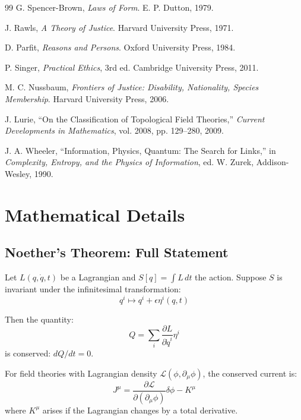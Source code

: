 \documentclass[12pt,letterpaper]{article}
\theoremstyle{definition}
\theoremstyle{remark}
\begin{document}
\begin{thebibliography}{99}
G. Spencer-Brown, \textit{Laws of Form}. E. P. Dutton, 1979.

J. Rawls, \textit{A Theory of Justice}. Harvard University Press, 1971.

D. Parfit, \textit{Reasons and Persons}. Oxford University Press, 1984.

P. Singer, \textit{Practical Ethics}, 3rd ed. Cambridge University Press, 2011.

M. C. Nussbaum, \textit{Frontiers of Justice: Disability, Nationality, Species Membership}. Harvard University Press, 2006.

J. Lurie, ``On the Classification of Topological Field Theories,'' \textit{Current Developments in Mathematics}, vol. 2008, pp. 129--280, 2009.

J. A. Wheeler, ``Information, Physics, Quantum: The Search for Links,'' in \textit{Complexity, Entropy, and the Physics of Information}, ed. W. Zurek, Addison-Wesley, 1990.

\end{thebibliography}

\appendix

\section{Mathematical Details}

\subsection{Noether's Theorem: Full Statement}

Let $L(q, \dot{q}, t)$ be a Lagrangian and $S[q] = \int L \, dt$ the action. Suppose $S$ is invariant under the infinitesimal transformation:
\begin{equation}
q^i \mapsto q^i + \epsilon \eta^i(q, t)
\end{equation}

Then the quantity:
\begin{equation}
Q = \sum_i \frac{\partial L}{\partial \dot{q}^i} \eta^i
\end{equation}
is conserved: $dQ/dt = 0$.

For field theories with Lagrangian density $\mathcal{L}(\phi, \partial_\mu \phi)$, the conserved current is:
\begin{equation}
J^\mu = \frac{\partial \mathcal{L}}{\partial (\partial_\mu \phi)} \delta \phi - K^\mu
\end{equation}
where $K^\mu$ arises if the Lagrangian changes by a total derivative.
\end{document}
